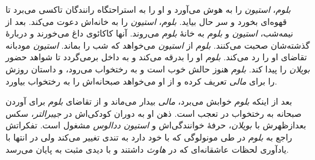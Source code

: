 \documentclass[12pt]{book}
\newcommand{\noun}[1]{\textit{\textcolor{black!70}{#1}}}
\begin{document}
    \noun{بلوم}، \noun{استیون} را به هوش می‌آورد و او را به استراحتگاه رانندگان تاکسی می‌برد تا قهوه‌ای بخورد و سر حال بیاید. \noun{بلوم}، \noun{استیون} را به خانه‌اش دعوت می‌کند.
    بعد از نیمه‌شب، \noun{استیون} و \noun{بلوم} به خانۀ \noun{بلوم} می‌روند. آنها کاکائوی داغ می‌خورند و دربارۀ گذشته‌شان صحبت می‌کنند. \noun{بلوم} از \noun{استیون} می‌خواهد که شب را بماند. \noun{استیون} مودبانه تقاضای او را رد می‌کند. \noun{بلوم} او را بدرقه می‌کند و به داخل برمی‌گردد تا شواهد حضور \noun{بویلان} را پیدا کند. \noun{بلوم} هنوز حالش خوب است و به رختخواب می‌رود، و داستان روزش را برای \noun{مالی} تعریف کرده و از او می‌خواهد صبحانه‌اش را به رختخواب بیاورد.

    بعد از اینکه \noun{بلوم} خوابش می‌برد، \noun{مالی} بیدار می‌ماند و از تقاضای \noun{بلوم} برای آوردن صبحانه به رختخواب در تعجب است. ذهن او به دوران کودکی‌اش در \noun{جیبرالتر}، سکس بعدازظهرش با \noun{بویلان}، حرفۀ خوانندگی‌اش و \noun{استیون ددالوس} مشغول است. تفکراتش راجع به \noun{بلوم} در طی مونولوگی که با خود دارد به تندی تغییر می‌کند ولی در انتها با یادآوری لحظات عاشقانه‌ای که در \noun{هاوث} داشتند و با دیدی مثبت به پایان می‌رسد.
\end{document}
